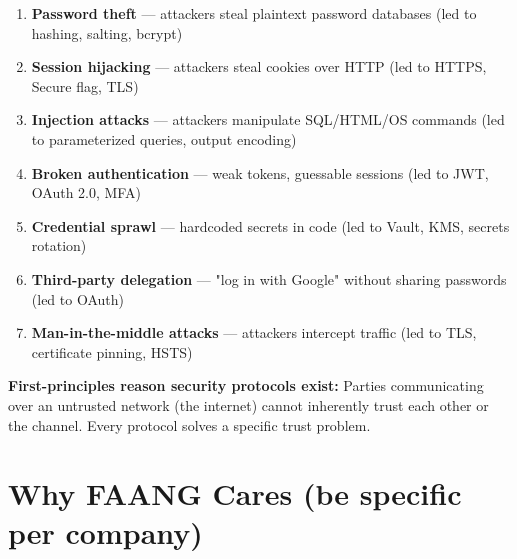 \documentclass[11pt]{article}
\providecommand{\tightlist}{\setlength{\itemsep}{1pt}\setlength{\parskip}{0pt}}
\begin{document}
\begin{enumerate}
\def\labelenumi{\arabic{enumi}.}
\tightlist
\item
  \textbf{Password theft} --- attackers steal plaintext password databases (led to hashing, salting, bcrypt)
\item
  \textbf{Session hijacking} --- attackers steal cookies over HTTP (led to HTTPS, Secure flag, TLS)
\item
  \textbf{Injection attacks} --- attackers manipulate SQL/HTML/OS commands (led to parameterized queries, output encoding)
\item
  \textbf{Broken authentication} --- weak tokens, guessable sessions (led to JWT, OAuth 2.0, MFA)
\item
  \textbf{Credential sprawl} --- hardcoded secrets in code (led to Vault, KMS, secrets rotation)
\item
  \textbf{Third-party delegation} --- "log in with Google" without sharing passwords (led to OAuth)
\item
  \textbf{Man-in-the-middle attacks} --- attackers intercept traffic (led to TLS, certificate pinning, HSTS)
\end{enumerate}

\textbf{First-principles reason security protocols exist:} Parties communicating over an untrusted network (the internet) cannot inherently trust each other or the channel. Every protocol solves a specific trust problem.

\section{Why FAANG Cares (be specific per company)}\label{why-faang-cares-be-specific-per-company}
\end{document}
